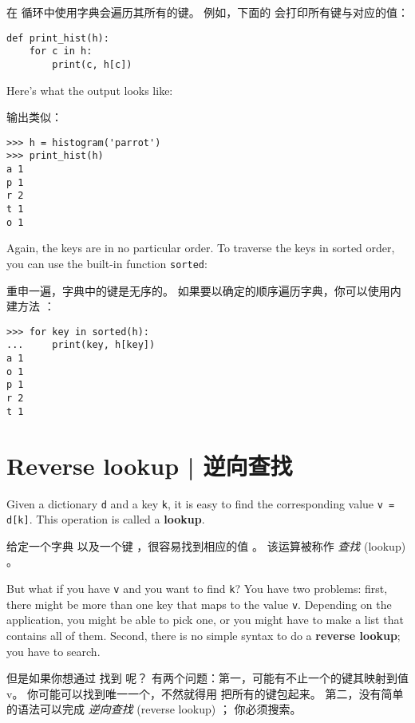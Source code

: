 在  循环中使用字典会遍历其所有的键。
例如，下面的  会打印所有键与对应的值：

\begin{lstlisting}
def print_hist(h):
    for c in h:
        print(c, h[c])
\end{lstlisting}

%
Here's what the output looks like:

输出类似：

\begin{lstlisting}
>>> h = histogram('parrot')
>>> print_hist(h)
a 1
p 1
r 2
t 1
o 1
\end{lstlisting}

%
Again, the keys are in no particular order.  To traverse the keys
in sorted order, you can use the built-in function {\tt sorted}:

重申一遍，字典中的键是无序的。
如果要以确定的顺序遍历字典，你可以使用内建方法 ：

  

\begin{lstlisting}
>>> for key in sorted(h):
...     print(key, h[key])
a 1
o 1
p 1
r 2
t 1
\end{lstlisting}



\section{Reverse lookup  |  逆向查找}
\label{raise}

  
  

Given a dictionary {\tt d} and a key {\tt k}, it is easy to
find the corresponding value {\tt v = d[k]}.  This operation
is called a {\bf lookup}.

给定一个字典  以及一个键  ，很容易找到相应的值  。
该运算被称作 {\em 查找} (lookup) 。

But what if you have {\tt v} and you want to find {\tt k}?
You have two problems: first, there might be more than one
key that maps to the value {\tt v}.  Depending on the application,
you might be able to pick one, or you might have to make
a list that contains all of them.  Second, there is no
simple syntax to do a {\bf reverse lookup}; you have to search.

但是如果你想通过  找到  呢？
有两个问题：第一，可能有不止一个的键其映射到值v。
你可能可以找到唯一一个，不然就得用  把所有的键包起来。
第二，没有简单的语法可以完成 {\em 逆向查找} (reverse lookup) ； 你必须搜索。

